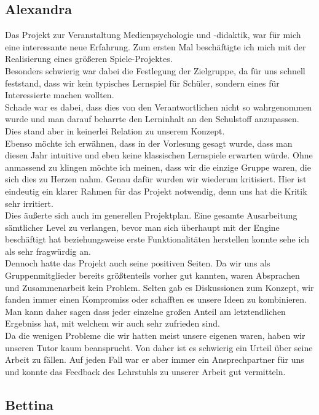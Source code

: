 \documentclass[10pt,a4paper,notitlepage]{report}
\begin{document}
	\subsection{Alexandra}
			Das Projekt zur Veranstaltung Medienpsychologie und -didaktik, war für mich eine interessante neue Erfahrung. 			Zum ersten Mal beschäftigte ich mich mit der Realisierung eines größeren Spiele-Projektes. \\
	Besonders schwierig war dabei die Festlegung der Zielgruppe, da für uns schnell feststand, dass wir kein typisches Lernspiel 			für Schüler, sondern eines für Interessierte machen wollten.\\
	Schade war es dabei, dass dies von den Verantwortlichen nicht so wahrgenommen wurde und man darauf beharrte den 				Lerninhalt an den Schulstoff anzupassen. Dies stand aber in keinerlei Relation zu unserem Konzept.\\
	Ebenso möchte ich erwähnen, dass in der Vorlesung gesagt wurde, dass man diesen Jahr intuitive und eben keine klassischen 			Lernspiele erwarten würde. Ohne anmassend zu klingen möchte ich meinen, dass wir die einzige Gruppe waren, die sich dies zu 	Herzen nahm. Genau dafür wurden wir wiederum kritisiert. Hier ist eindeutig ein klarer Rahmen für das Projekt notwendig, 			denn uns hat die Kritik sehr irritiert.\\
	Dies äußerte sich auch im generellen Projektplan. Eine gesamte Ausarbeitung sämtlicher Level zu verlangen, bevor man sich 			überhaupt mit der Engine beschäftigt hat beziehungsweise erste Funktionalitäten herstellen konnte sehe ich als sehr 				fragwürdig an.\\
	Dennoch hatte das Projekt auch seine positiven Seiten. Da wir uns als Gruppenmitglieder bereits größtenteils vorher gut 			kannten, waren Absprachen und Zusammenarbeit kein Problem. Selten gab es Diskussionen zum Konzept, wir fanden immer 			einen Kompromiss oder schafften es unsere Ideen zu kombinieren. Man kann daher sagen dass jeder einzelne großen Anteil am 	letztendlichen Ergebniss hat, mit welchem wir auch sehr zufrieden sind.\\
	Da die wenigen Probleme die wir hatten meist unsere eigenen waren, haben wir unseren Tutor kaum beansprucht. Von daher 			ist es schwierig ein Urteil über seine Arbeit zu fällen. Auf jeden Fall war er aber immer ein Ansprechpartner für uns und konnte 			das Feedback des Lehrstuhls zu unserer Arbeit gut vermitteln.\\

	\subsection{Bettina}
\end{document}

